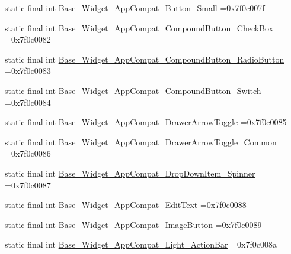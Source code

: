 \begin{DoxyCompactItemize}
\item 
static final int \mbox{\hyperlink{classbr_1_1unb_1_1cic_1_1mp_1_1marketmaster_1_1test_1_1R_1_1style_ad77116855f1a451e98c5f3a35ff8ee51}{Base\+\_\+\+Widget\+\_\+\+App\+Compat\+\_\+\+Button\+\_\+\+Small}} =0x7f0c007f
\item 
static final int \mbox{\hyperlink{classbr_1_1unb_1_1cic_1_1mp_1_1marketmaster_1_1test_1_1R_1_1style_af839876c591cf2c3f66e6ba688875d51}{Base\+\_\+\+Widget\+\_\+\+App\+Compat\+\_\+\+Compound\+Button\+\_\+\+Check\+Box}} =0x7f0c0082
\item 
static final int \mbox{\hyperlink{classbr_1_1unb_1_1cic_1_1mp_1_1marketmaster_1_1test_1_1R_1_1style_a4391462ee14559457804ce6d5ba49b5a}{Base\+\_\+\+Widget\+\_\+\+App\+Compat\+\_\+\+Compound\+Button\+\_\+\+Radio\+Button}} =0x7f0c0083
\item 
static final int \mbox{\hyperlink{classbr_1_1unb_1_1cic_1_1mp_1_1marketmaster_1_1test_1_1R_1_1style_ae631d05f7f3e2628f121a78fcaed125a}{Base\+\_\+\+Widget\+\_\+\+App\+Compat\+\_\+\+Compound\+Button\+\_\+\+Switch}} =0x7f0c0084
\item 
static final int \mbox{\hyperlink{classbr_1_1unb_1_1cic_1_1mp_1_1marketmaster_1_1test_1_1R_1_1style_a7edc9fa19aa8e29d5ee31c78eaa221d6}{Base\+\_\+\+Widget\+\_\+\+App\+Compat\+\_\+\+Drawer\+Arrow\+Toggle}} =0x7f0c0085
\item 
static final int \mbox{\hyperlink{classbr_1_1unb_1_1cic_1_1mp_1_1marketmaster_1_1test_1_1R_1_1style_a4c462be03edd9ccf91ff1399f1159a70}{Base\+\_\+\+Widget\+\_\+\+App\+Compat\+\_\+\+Drawer\+Arrow\+Toggle\+\_\+\+Common}} =0x7f0c0086
\item 
static final int \mbox{\hyperlink{classbr_1_1unb_1_1cic_1_1mp_1_1marketmaster_1_1test_1_1R_1_1style_a42b948e86ff0e714c266ab76016db8ea}{Base\+\_\+\+Widget\+\_\+\+App\+Compat\+\_\+\+Drop\+Down\+Item\+\_\+\+Spinner}} =0x7f0c0087
\item 
static final int \mbox{\hyperlink{classbr_1_1unb_1_1cic_1_1mp_1_1marketmaster_1_1test_1_1R_1_1style_a58b3b7683865fc1e507c9d3ed243f726}{Base\+\_\+\+Widget\+\_\+\+App\+Compat\+\_\+\+Edit\+Text}} =0x7f0c0088
\item 
static final int \mbox{\hyperlink{classbr_1_1unb_1_1cic_1_1mp_1_1marketmaster_1_1test_1_1R_1_1style_a9bd38c8271d86408a713063fc9d8a276}{Base\+\_\+\+Widget\+\_\+\+App\+Compat\+\_\+\+Image\+Button}} =0x7f0c0089
\item 
static final int \mbox{\hyperlink{classbr_1_1unb_1_1cic_1_1mp_1_1marketmaster_1_1test_1_1R_1_1style_a526e260db9db6c12cafc2a17495166a5}{Base\+\_\+\+Widget\+\_\+\+App\+Compat\+\_\+\+Light\+\_\+\+Action\+Bar}} =0x7f0c008a

\end{DoxyCompactItemize}
